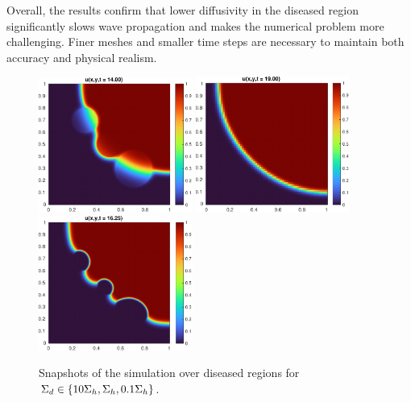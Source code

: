 \documentclass[unicode,11pt,a4paper,oneside,numbers=endperiod,openany]{article}
\begin{document}
Overall, the results confirm that lower diffusivity in the diseased region
significantly slows wave propagation and makes the numerical problem more
challenging. Finer meshes and smaller time steps are necessary to maintain both
accuracy and physical realism.

\begin{figure}[H]
	\centering
	\includegraphics[width=0.45\textwidth]{figs/S10.pdf}
	\includegraphics[width=0.45\textwidth]{figs/S1.pdf}
	\includegraphics[width=0.45\textwidth]{figs/S01.pdf}
	\caption{Snapshots of the simulation over diseased regions for $\Sigma_d \in \qty{10\Sigma_h, \Sigma_h, 0.1\Sigma_h}$.}
\end{figure}

\nocite{*}


\end{document}
